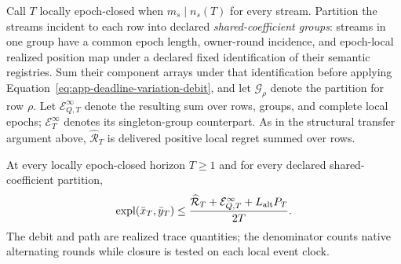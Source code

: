 Call $T$ locally epoch-closed when $m_s\mid n_s(T)$ for every stream.
Partition the streams incident to each row into declared
\emph{shared-coefficient groups}: streams in one group have a common epoch
length, owner-round incidence, and epoch-local realized position map under a
declared fixed identification of their semantic registries.  Sum their
component arrays under that identification before applying
Equation~\ref{eq:app-deadline-variation-debit}, and let
$\mathcal G_\rho$ denote the partition for row $\rho$.  Let
$\mathcal E_{Q,T}^\infty$ denote the resulting sum over rows, groups, and
complete local epochs; $\mathcal E_T^\infty$ denotes its singleton-group
counterpart.  As in the structural transfer argument above,
$\widehat{\mathcal R}_T$ is delivered positive local regret summed over rows.

\begin{theorem}
\label{thm:deadline-weighted-refinement}
At every locally epoch-closed horizon $T\ge1$ and for every declared
shared-coefficient partition,
\begin{equation}
\operatorname{expl}(\bar x_T,\bar y_T)
\le\frac{\widehat{\mathcal R}_T+\mathcal E_{Q,T}^\infty
+L_{\rm alt}P_T}{2T}.
\label{eq:deadline-weighted-bound}
\end{equation}
The debit and path are realized trace quantities; the denominator counts
native alternating rounds while closure is tested on each local event clock.
\end{theorem}

